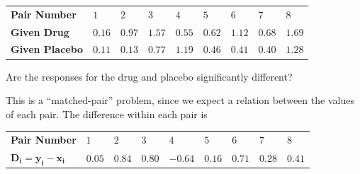 \documentclass[
]{book}
\begin{document}
\begin{longtable}[]{@{}
  >{\centering\arraybackslash}p{}
  >{\centering\arraybackslash}p{}
  >{\centering\arraybackslash}p{}
  >{\centering\arraybackslash}p{}
  >{\centering\arraybackslash}p{}
  >{\centering\arraybackslash}p{}
  >{\centering\arraybackslash}p{}
  >{\centering\arraybackslash}p{}
  >{\centering\arraybackslash}p{}@{}}
\toprule\noalign{}
\endhead
\bottomrule\noalign{}
\endlastfoot
\textbf{Pair Number} & \(1\) & \(2\) & \(3\) & \(4\) & \(5\) & \(6\) & \(7\) & \(8\) \\
\textbf{Given Drug} & \(0.16\) & \(0.97\) & \(1.57\) & \(0.55\) & \(0.62\) & \(1.12\) & \(0.68\) & \(1.69\) \\
\textbf{Given Placebo} & \(0.11\) & \(0.13\) & \(0.77\) & \(1.19\) & \(0.46\) & \(0.41\) & \(0.40\) & \(1.28\) \\
\end{longtable}

Are the responses for the drug and placebo significantly different?

This is a ``matched-pair'' problem, since we expect a relation between the values of each pair. The difference within each pair is

\begin{longtable}[]{@{}
  >{\centering\arraybackslash}p{}
  >{\centering\arraybackslash}p{}
  >{\centering\arraybackslash}p{}
  >{\centering\arraybackslash}p{}
  >{\centering\arraybackslash}p{}
  >{\centering\arraybackslash}p{}
  >{\centering\arraybackslash}p{}
  >{\centering\arraybackslash}p{}
  >{\centering\arraybackslash}p{}@{}}
\toprule\noalign{}
\endhead
\bottomrule\noalign{}
\endlastfoot
\textbf{Pair Number} & \(1\) & \(2\) & \(3\) & \(4\) & \(5\) & \(6\) & \(7\) & \(8\) \\
\(\mathbf{D_i=y_i-x_i}\) & \(0.05\) & \(0.84\) & \(0.80\) & \(-0.64\) & \(0.16\) & \(0.71\) & \(0.28\) & \(0.41\) \\
\end{longtable}
\end{document}
